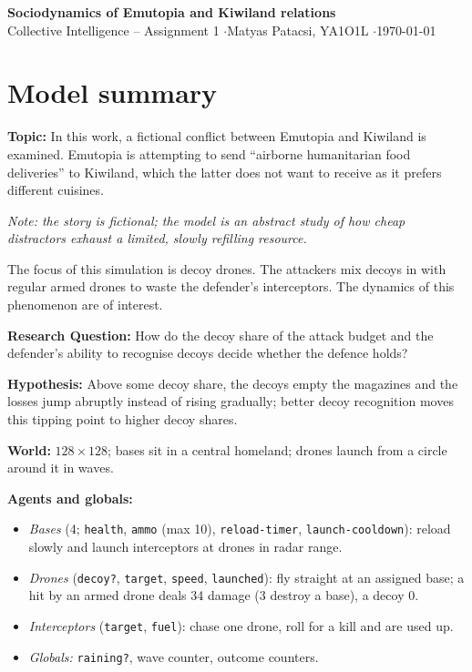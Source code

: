 \documentclass[12pt,a4paper]{article}
\begin{document}
\begin{center}
    {\Large\textbf{Sociodynamics of Emutopia and Kiwiland relations}}\\[2pt]
    Collective Intelligence -- Assignment 1 \quad$\cdot$\quad Matyas Patacsi, YA1O1L \quad$\cdot$\quad \today

\end{center}
\vspace{-0.6cm}

\section{Model summary}
\textbf{Topic:} In this work, a fictional conflict between Emutopia and Kiwiland is examined. Emutopia is attempting to send ``airborne humanitarian food deliveries'' to Kiwiland, which the latter does not want to receive as it prefers different cuisines.

\textit{Note: the story is fictional; the model is an abstract study of how cheap distractors exhaust a limited, slowly refilling resource.}

The focus of this simulation is decoy drones. The attackers mix decoys in with regular armed drones to waste the defender's interceptors. The dynamics of this phenomenon are of interest.

\textbf{Research Question:} How do the decoy share of the attack budget and the defender's ability to recognise decoys decide whether the defence holds?

\textbf{Hypothesis:} Above some decoy share, the decoys empty the magazines and the losses jump abruptly instead of rising gradually; better decoy recognition moves this tipping point to higher decoy shares.

\textbf{World:} $128\times128$; bases sit in a central homeland; drones launch from a circle around it in waves.

\textbf{Agents and globals:}
\begin{itemize}
    \item \emph{Bases} (4; \texttt{health}, \texttt{ammo} (max 10), \texttt{reload-timer}, \texttt{launch-cooldown}): reload slowly and launch interceptors at drones in radar range.
    \item \emph{Drones} (\texttt{decoy?}, \texttt{target}, \texttt{speed}, \texttt{launched}): fly straight at an assigned base; a hit by an armed drone deals 34 damage (3 destroy a base), a decoy 0.
    \item \emph{Interceptors} (\texttt{target}, \texttt{fuel}): chase one drone, roll for a kill and are used up.
    \item \emph{Globals:} \texttt{raining?}, wave counter, outcome counters.
\end{itemize}
\end{document}
